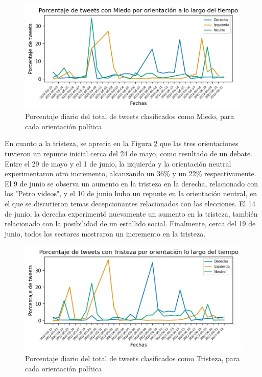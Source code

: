 \begin{figure}[!htbp]
	\centering
	\includegraphics{Images & Logos/Results/Porcentaje de tweets con Miedo por sector lo largo del tiempo.png}
	\caption{Porcentaje diario del total de tweets clasificados como Miedo, para cada orientación política}
	\label{figure:tweets_percent_Miedo_tiempo}
\end{figure}

En cuanto a la tristeza, se aprecia en la Figura \ref{figure:tweets_percent_Tristeza_tiempo} que las tres orientaciones tuvieron un repunte inicial cerca del 24 de mayo, como resultado de un debate. Entre el 29 de mayo y el 1 de junio, la izquierda y la orientación neutral experimentaron otro incremento, alcanzando un 36\% y un 22\% respectivamente. El 9 de junio se observa un aumento en la tristeza en la derecha, relacionado con los "Petro videos", y el 10 de junio hubo un repunte en la orientación neutral, en el que se discutieron temas decepcionantes relacionados con las elecciones. El 14 de junio, la derecha experimentó nuevamente un aumento en la tristeza, también relacionado con la posibilidad de un estallido social. Finalmente, cerca del 19 de junio, todos los sectores mostraron un incremento en la tristeza.

\begin{figure}[!htbp]
	\centering
	\includegraphics{Images & Logos/Results/Porcentaje de tweets con Tristeza por sector lo largo del tiempo.png}
	\caption{Porcentaje diario del total de tweets clasificados como Tristeza, para cada orientación política}
	\label{figure:tweets_percent_Tristeza_tiempo}
\end{figure}

